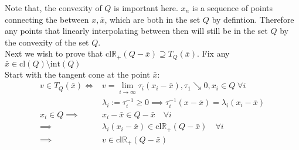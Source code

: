 \documentclass[]{article}
\begin{document}
    Note that, the convexity of $Q$ is important here. $x_n$ is a sequence of points connecting the between $x, \bar{x}$, which are both in the set $Q$ by defintion. Therefore any points that linearly interpolating between then will still be in the set $Q$ by the convexity of the set $Q$.
    \\[1.1em]
    Next we wish to prove that $\text{cl}\mathbb{R}_+(Q - \bar{x})\supseteq T_Q(\bar{x})$. Fix any $\bar{x}\in \text{cl}(Q)\setminus \text{int}(Q)$
    \\
    Start with the tangent cone at the point $\bar{x}$: 
    \begin{align*}\tag{2.33.2}\label{eqn:2.33.2}
        v \in T_Q(\bar{x}) \iff& v = \lim_{i \rightarrow \infty} \tau_i (x_i - \bar{x}), \tau_1 \searrow 0 , x_i \in Q \; \forall i 
        \\
        & \lambda_i  := \tau_i^{-1} \ge 0 \implies  \tau_i^{-1}(x - \bar{x}) = \lambda_i (x_i - \bar{x})
        \\
        x_i \in Q \implies&  x_i - \bar{x} \in Q - \bar{x} \quad \forall i
        \\
        \implies& \lambda_i (x_i -\bar{x}) \in \text{cl}\mathbb{R}_+(Q - \bar{x}) \quad \forall i
        \\
        \implies&  v \in \text{cl} \mathbb{R}_+(Q - \bar{x})
    \end{align*}
\end{document}
